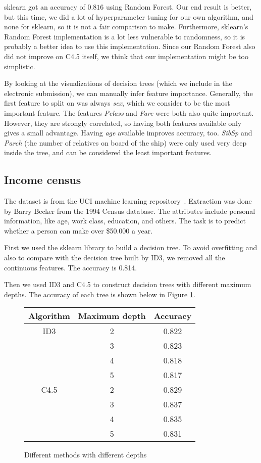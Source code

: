 \documentclass[a4paper]{article}
\begin{document}
sklearn got an accuracy of $0.816$ using Random Forest. Our end result is better, but this time, we did a lot of hyperparameter tuning for our own algorithm, and none for sklearn, so it is not a fair comparison to make. Furthermore, sklearn's Random Forest implementation is a lot less vulnerable to randomness, so it is probably a better idea to use this implementation. Since our Random Forest also did not improve on C4.5 itself, we think that our implementation might be too simplistic.

By looking at the visualizations of decision trees (which we include in the electronic submission), we can manually infer feature importance. Generally, the first feature to split on was always \emph{sex}, which we consider to be the most important feature. The features \emph{Pclass} and \emph{Fare} were both also quite important. However, they are strongly correlated, so having both features available only gives a small advantage. Having \emph{age} available improves accuracy, too. \emph{SibSp} and \emph{Parch} (the number of relatives on board of the ship) were only used very deep inside the tree, and can be considered the least important features.

\subsection{Income census}

The dataset is from the UCI machine learning repository~\cite{census}. Extraction was done by Barry Becker from the 1994 Census database. The attributes include personal information, like age, work class, education, and others. The task is to predict whether a person can make over \$50.000 a year.

First we used the sklearn library to build a decision tree. To avoid overfitting and also to compare with the decision tree built by ID3, we removed all the continuous features. The accuracy is 0.814.

Then we used ID3 and C4.5 to construct decision trees with different maximum depths. The accuracy of each tree is shown below in Figure \ref{fig:id3c45all}.
\begin{figure}[h]
\centering
    \begin{tabular}{c|c|c}
       Algorithm & Maximum depth & Accuracy \\
        \hline
        ID3 &2& 0.822\\
        & 3 & 0.823\\
        & 4& 0.818\\
        & 5& 0.817\\
        \hline
        C4.5 &2& 0.829\\
        &3 & 0.837\\
        &4 & 0.835\\
        &5 & 0.831\\
     \end{tabular}
     \caption{Different methods with different depths}
     \label{fig:id3c45all}
\end{figure}
\end{document}
